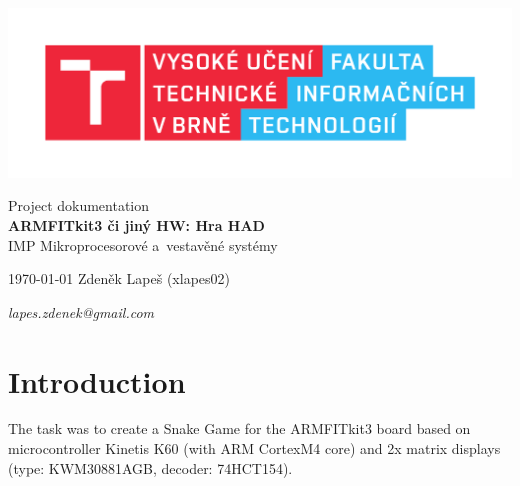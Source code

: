 \documentclass[a4paper, 11pt]{article}
\begin{document}
    \begin{titlepage}
        \begin{center}
            \includegraphics[width=0.77\linewidth]{FIT_logo} \\


            \Huge{Project dokumentation} \\
            \LARGE{\textbf{
                ARM\-FITkit3 či jiný HW: Hra HAD
            }} \\
            \Large{IMP \- Mikroprocesorové a~vestavěné systémy}

        \end{center}

        {\Large
        \today
        \hfill
        Zdeněk Lapeš (xlapes02)

            \hfill
            \large{\textit{lapes.zdenek@gmail.com}}
        }
    \end{titlepage}


    \setcounter{page}{1}
    \tableofcontents
    \clearpage


    \setcounter{page}{1}




    \section{Introduction}\label{sec:introduction}
    The task was to create a Snake Game for the ARM\-FITkit3 board based on
    microcontroller Kinetis K60 (with ARM Cortex\-M4 core) and 2x matrix displays
    (type: KWM\-30881AGB, decoder: 74HCT154).
\end{document}
